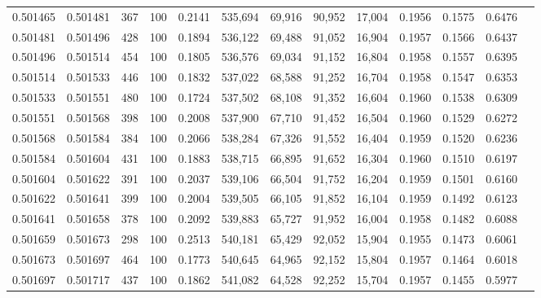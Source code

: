 \begin{tabular}{rrrrrrrrrrrrr}
0.501465 & 0.501481 &   367 & 100 &                                     0.2141 & 535,694 &  69,916 &  90,952 &  17,004 & 0.1956 & 0.1575 & 0.6476 \\
0.501481 & 0.501496 &   428 & 100 &                                     0.1894 & 536,122 &  69,488 &  91,052 &  16,904 & 0.1957 & 0.1566 & 0.6437 \\
0.501496 & 0.501514 &   454 & 100 &                                     0.1805 & 536,576 &  69,034 &  91,152 &  16,804 & 0.1958 & 0.1557 & 0.6395 \\
0.501514 & 0.501533 &   446 & 100 &                                     0.1832 & 537,022 &  68,588 &  91,252 &  16,704 & 0.1958 & 0.1547 & 0.6353 \\
0.501533 & 0.501551 &   480 & 100 &                                     0.1724 & 537,502 &  68,108 &  91,352 &  16,604 & 0.1960 & 0.1538 & 0.6309 \\
0.501551 & 0.501568 &   398 & 100 &                                     0.2008 & 537,900 &  67,710 &  91,452 &  16,504 & 0.1960 & 0.1529 & 0.6272 \\
0.501568 & 0.501584 &   384 & 100 &                                     0.2066 & 538,284 &  67,326 &  91,552 &  16,404 & 0.1959 & 0.1520 & 0.6236 \\
0.501584 & 0.501604 &   431 & 100 &                                     0.1883 & 538,715 &  66,895 &  91,652 &  16,304 & 0.1960 & 0.1510 & 0.6197 \\
0.501604 & 0.501622 &   391 & 100 &                                     0.2037 & 539,106 &  66,504 &  91,752 &  16,204 & 0.1959 & 0.1501 & 0.6160 \\
0.501622 & 0.501641 &   399 & 100 &                                     0.2004 & 539,505 &  66,105 &  91,852 &  16,104 & 0.1959 & 0.1492 & 0.6123 \\
0.501641 & 0.501658 &   378 & 100 &                                     0.2092 & 539,883 &  65,727 &  91,952 &  16,004 & 0.1958 & 0.1482 & 0.6088 \\
0.501659 & 0.501673 &   298 & 100 &                                     0.2513 & 540,181 &  65,429 &  92,052 &  15,904 & 0.1955 & 0.1473 & 0.6061 \\
0.501673 & 0.501697 &   464 & 100 &                                     0.1773 & 540,645 &  64,965 &  92,152 &  15,804 & 0.1957 & 0.1464 & 0.6018 \\
0.501697 & 0.501717 &   437 & 100 &                                     0.1862 & 541,082 &  64,528 &  92,252 &  15,704 & 0.1957 & 0.1455 & 0.5977 \\

\end{tabular}
